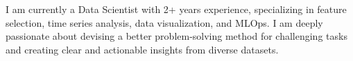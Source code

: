 
\begin{cvparagraph}

I am currently a Data Scientist with 2+ years experience, specializing in feature selection, time series analysis, data visualization, and MLOps. I am deeply passionate about devising a better problem-solving method for challenging tasks and creating clear and actionable insights from diverse datasets.
\end{cvparagraph}
